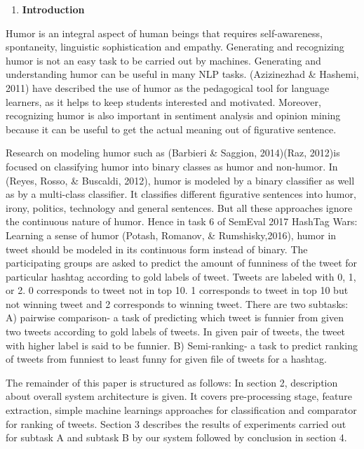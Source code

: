 \documentclass{article} %
\begin{document}
\begin{enumerate}
\item  \textbf{Introduction}
\end{enumerate}

\noindent Humor is an integral aspect of human beings that requires self-awareness, spontaneity, linguistic sophistication and empathy. Generating and recognizing humor is not an easy task to be carried out by machines. Generating and understanding humor can be useful in many NLP tasks. (Azizinezhad \& Hashemi, 2011) have described the use of humor as the pedagogical tool for language learners, as it helps to keep students interested and motivated. Moreover, recognizing humor is also important in sentiment analysis and opinion mining because it can be useful to get the actual meaning out of figurative sentence.

Research on modeling humor  such as (Barbieri \& Saggion, 2014)(Raz, 2012)is focused on classifying humor into binary classes as humor and non-humor. In (Reyes, Rosso, \& Buscaldi, 2012), humor is modeled by a binary classifier as well as by a multi-class classifier. It classifies different figurative sentences into humor, irony, politics, technology and general sentences. But all these approaches ignore the continuous nature of humor. Hence in task 6 of SemEval 2017 HashTag Wars: Learning a sense of humor (Potash, Romanov, \& Rumshisky,2016), humor in tweet should be  modeled in its continuous form instead of binary. The participating groups are asked to predict the amount of funniness of the tweet for particular hashtag according to gold labels of tweet. Tweets are labeled with 0, 1, or 2. 0 corresponds to tweet not in top 10. 1 corresponds to tweet in top 10 but not winning tweet and 2 corresponds to winning tweet. There are two subtasks: A) pairwise comparison- a task of predicting which tweet is funnier from given two tweets according to gold labels of tweets. In given pair of tweets, the tweet with higher label is said to be funnier. B) Semi-ranking- a task to predict ranking of tweets from funniest to least funny for given file of tweets for a hashtag.

The remainder of this paper is structured as follows: In section 2, description about overall system architecture is given. It covers pre-processing stage, feature extraction, simple machine learnings approaches for classification and comparator for ranking of tweets. Section 3 describes the results of experiments carried out for subtask A and subtask B by our system followed by conclusion in section 4.
\end{document}
